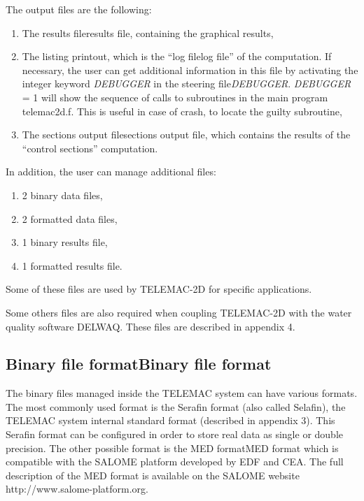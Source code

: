  The output files are the following:

\begin{enumerate}
\item  The results fileresults file, containing the graphical results,

\item  The listing printout, which is the ``log filelog file'' of the computation. If necessary, the user can get additional information in this file by activating the integer keyword \textit{DEBUGGER} in the steering file\textit{DEBUGGER}. \textit{DEBUGGER} = 1 will show the sequence of calls to subroutines in the main program telemac2d.f. This is useful in case of crash, to locate the guilty subroutine,

\item  The sections output filesections output file, which contains the results of the ``control sections'' computation.
\end{enumerate}

 In addition, the user can manage additional files:

\begin{enumerate}
\item  2 binary data files,

\item  2 formatted data files,

\item  1 binary results file,

\item  1 formatted results file.
\end{enumerate}

 Some of these files are used by TELEMAC-2D for specific applications.

 Some others files are also required when coupling TELEMAC-2D with the water quality software DELWAQ. These files are described in appendix 4.


\subsection{ Binary file formatBinary file format}

 The binary files managed inside the TELEMAC system can have various formats. The most commonly used format is the Serafin format (also called Selafin), the TELEMAC system internal standard format (described in appendix 3). This Serafin format can be configured in order to store real data as single or double precision. The other possible format is the MED formatMED format which is compatible with the SALOME platform developed by EDF and CEA. The full description of the MED format is available on the SALOME website http://www.salome-platform.org.

